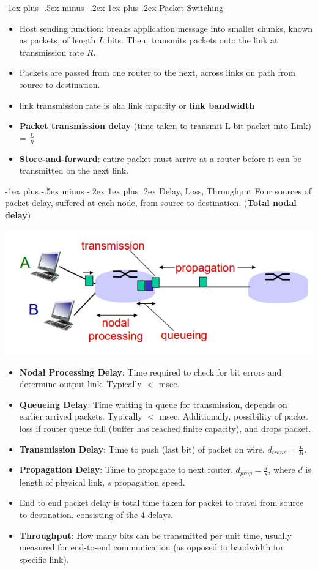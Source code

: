 \documentclass[12pt, landscape]{article}
\makeatletter
\renewcommand{\subsubsection}{\@startsection{subsubsection}{3}{0.1mm}%
                                {-1ex plus -.5ex minus -.2ex}%
                                {1ex plus .2ex}%
                                {\normalfont\small\bfseries}}
\makeatother
\begin{document}
\begin{multicols*}{3}
\subsubsection{Packet Switching}
\begin{itemize}
\item Host sending function: breaks application message into smaller 
chunks, known as packets, of length $L$ bits. Then, transmits packets onto the link at transmission rate $R$.
\item Packets are passed from one router to the next, across links on path from source to destination.
\item link transmission rate is aka link capacity or \textbf{link bandwidth}
\item \textbf{Packet transmission delay} (time taken to transmit L-bit packet into Link) = $\frac{L}{R}$
\item \textbf{Store-and-forward}: entire packet must arrive at a router before it can be transmitted on the next link.
\end{itemize}


\subsubsection{Delay, Loss, Throughput}
Four sources of packet delay, suffered at each node, from source to destination. (\textbf{Total nodal delay})
\centerline{\includegraphics[width=0.6\linewidth]{totalnodaldelay}}
\begin{itemize}
\item \textbf{Nodal Processing Delay}: Time required to check for bit errors and determine output link. Typically $<$ msec.
\item \textbf{Queueing Delay}: Time waiting in queue for transmission, depends on earlier arrived packets. Typically $<$ msec. Additionally, possibility of
						packet loss if router queue full (buffer has reached finite capacity), and drops packet.
\item \textbf{Transmission Delay}: Time to push (last bit) of packet on wire. $d_{trans} = \frac{L}{R}$.
\item \textbf{Propagation Delay}: Time to propagate to next router. $d_{prop} = \frac{d}{s}$, where $d$ is length of physical link, $s$ propagation speed.
\item End to end packet delay is total time taken for packet to travel from source to destination, consisting of the 4 delays.
\item \textbf{Throughput}: How many bits can be transmitted per unit time, usually measured for end-to-end communication (as opposed to bandwidth for specific link).
\end{itemize}


\end{multicols*}
\end{document}
